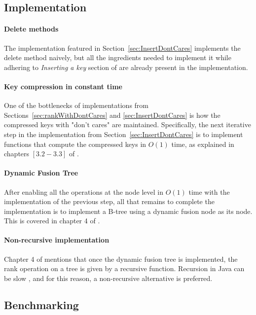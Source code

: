 \subsection{Implementation} \label{sec:FutureWorkImplementation}

\paragraph*{Delete methods}
The implementation featured in Section~\ref{sec:InsertDontCares} implements the {\ttfamily delete} method naively, but all the ingredients needed to implement it while adhering to \textit{Inserting a key} section of \cite{patrascu2014dynamic} are already present in the implementation.

\paragraph*{Key compression in constant time}
One of the bottlenecks of implementations from Sections~\ref{sec:rankWithDontCares} and \ref{sec:InsertDontCares} is how the compressed keys with "don't cares" are maintained. Specifically, the next iterative step in the implementation from Section~\ref{sec:InsertDontCares} is to implement functions that compute the compressed keys in $O(1)$ time, as explained in chapters $[3.2 - 3.3]$ of \cite{patrascu2014dynamic}.

\paragraph*{Dynamic Fusion Tree}
After enabling all the operations at the node level in $O(1)$ time with the implementation of the previous step, all that remains to complete the implementation is to implement a B-tree using a dynamic fusion node as its node. This is covered in chapter 4 of \cite{patrascu2014dynamic}.

\paragraph*{Non-recursive implementation}
Chapter 4 of \cite{patrascu2014dynamic} mentions that once the dynamic fusion tree is implemented, the rank operation on a tree is given by a recursive function. Recursion in Java can be slow \cite{shirazi2003java}, and for this reason, a non-recursive alternative is preferred.


\subsection{Benchmarking}

